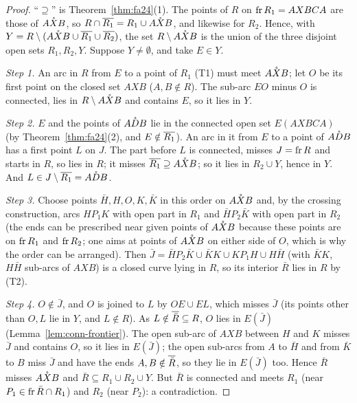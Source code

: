 \begin{proof}
``$\supseteq$'' is Theorem~\ref{thm:fa24}(1). The points of $R$ on $\operatorname{fr} R_1=AXBCA$ are those of $\mathring{AXB}$, so
$R\cap\overline{R_1}=R_1\cup\mathring{AXB}$, and likewise for $R_2$. Hence, with $Y=R\setminus(\mathring{AXB}\cup\overline{R_1}\cup\overline{R_2})$, the set $R\setminus\mathring{AXB}$ is the union of the three disjoint open sets $R_1,R_2,Y$. Suppose
$Y\ne\emptyset$, and take $E\in Y$.

\emph{Step 1.} An arc in $R$ from $E$ to a point of $R_1$ (T1) must meet $\mathring{AXB}$; let $O$ be its first point on
the closed set $AXB$ ($A,B\notin R$). The sub-arc $EO$ minus $O$ is connected, lies in $R\setminus\mathring{AXB}$ and
contains $E$, so it lies in $Y$.

\emph{Step 2.} $E$ and the points of $\mathring{ADB}$ lie in the connected open set $E(AXBCA)$ (by
Theorem~\ref{thm:fa24}(2), and $E\notin\overline{R_1}$). An arc in it from $E$ to a point of $\mathring{ADB}$ has a first
point $L$ on $J$. The part before $L$ is connected, misses $J=\operatorname{fr} R$ and starts in $R$, so lies in $R$; it misses
$\overline{R_1}\supseteq\mathring{AXB}$; so it lies in $R_2\cup Y$, hence in $Y$. And $L\in J\setminus\overline{R_1}=\mathring{ADB}$.

\emph{Step 3.} Choose points $\bar H,H,O,K,\bar K$ in this order on $\mathring{AXB}$ and, by the crossing construction, arcs
$HP_1K$ with open part in $R_1$ and $\bar HP_2\bar K$ with open part in $R_2$ (the ends can be prescribed near
given points of $\mathring{AXB}$ because these points are on $\operatorname{fr} R_1$ and $\operatorname{fr} R_2$; one aims at points of $\mathring{AXB}$
on either side of $O$, which is why the order can be arranged). Then
$\bar J=\bar HP_2\bar K\cup\bar KK\cup KP_1H\cup H\bar H$ (with $\bar KK$, $H\bar H$ sub-arcs of $AXB$) is a closed curve
lying in $R$, so its interior $\bar R$ lies in $R$ by (T2).

\emph{Step 4.} $O\notin\bar J$, and $O$ is joined to $L$ by $OE\cup EL$, which misses $\bar J$ (its points other than $O,L$
lie in $Y$, and $L\notin R$). As $L\notin\overline{\bar R}\subseteq R$, $O$ lies in $E(\bar J)$ (Lemma~\ref{lem:conn-frontier}).
The open sub-arc of $AXB$ between $H$ and $K$ misses $\bar J$ and contains $O$, so it lies in $E(\bar J)$; the open
sub-arcs from $A$ to $\bar H$ and from $\bar K$ to $B$ miss $\bar J$ and have the ends $A,B\notin\overline{\bar R}$, so they lie
in $E(\bar J)$ too. Hence $\bar R$ misses $\mathring{AXB}$ and $\bar R\subseteq R_1\cup R_2\cup Y$. But $\bar R$ is connected and
meets $R_1$ (near $P_1\in\operatorname{fr}\bar R\cap R_1$) and $R_2$ (near $P_2$): a contradiction.
\end{proof}

